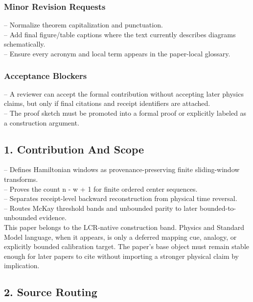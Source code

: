 \documentclass[11pt]{article}
\begin{document}
\subsubsection*{Minor Revision Requests}

\noindent{}-- Normalize theorem capitalization and punctuation.\\
\noindent{}-- Add final figure/table captions where the text currently describes diagrams schematically.\\
\noindent{}-- Ensure every acronym and local term appears in the paper-local glossary.\\

\subsubsection*{Acceptance Blockers}

\noindent{}-- A reviewer can accept the formal contribution without accepting later physics claims, but only if final citations and receipt identifiers are attached.\\
\noindent{}-- The proof sketch must be promoted into a formal proof or explicitly labeled as a construction argument.\\


\subsection*{1. Contribution And Scope}

\noindent{}-- Defines Hamiltonian windows as provenance-preserving finite sliding-window transforms.\\
\noindent{}-- Proves the count n - w + 1 for finite ordered center sequences.\\
\noindent{}-- Separates receipt-level backward reconstruction from physical time reversal.\\
\noindent{}-- Routes McKay threshold bands and unbounded parity to later bounded-to-unbounded evidence.\\

This paper belongs to the LCR-native construction band. Physics and Standard Model language, when it appears, is only a deferred mapping cue, analogy, or explicitly bounded calibration target. The paper's base object must remain stable enough for later papers to cite without importing a stronger physical claim by implication.

\subsection*{2. Source Routing}
\end{document}
